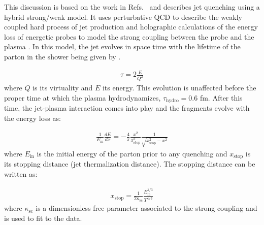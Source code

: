 
This discussion is based on the work in Refs.~\cite{Casalderrey-Solana:2014bpa, Hulcher:2017cpt, Casalderrey-Solana:2016jvj} and describes jet quenching using a hybrid strong/weak model.
It uses perturbative QCD to describe the weakly coupled hard process of jet production and holographic calculations of the energy loss of energetic probes to model the strong coupling between the probe and the plasma \cite{Chesler:2015nqz, Chesler:2014jva}.
In this model, the jet evolves in space time with the lifetime of the parton in the shower being given by \cite{CasalderreySolana:2011gx}.
 

\begin{align}
\tau = 2 \frac{E}{Q^2}
\end{align}
where $Q$ is its virtuality and $E$ its energy.
This evolution is unaffected before the proper time at which the plasma hydrodynamizes, $\tau_{\text{hydro}} = 0.6$ fm.
After this time, the jet-plasma interaction comes into play and the fragments evolve with the energy loss as:

\begin{align}
\frac{1}{E_{\mathrm{in}}} \frac{dE}{dx} = -\frac{4}{\pi} \frac{x^2}{x_{\mathrm{stop}}^2} \frac{1}{\sqrt{x_{\mathrm{stop}}^2 - x^2}}
\end{align}
where $E_{\mathrm{in}}$ is the initial energy of the parton prior to any quenching and $x_{\mathrm{stop}}$ is its stopping distance (jet thermalization distance).
The stopping distance can be written as:

\begin{align}
x_\mathrm{stop} = \frac{1}{2\kappa_\mathrm{sc}} \frac{E_\mathrm{in}^{1/3}}{T^{4/3}}
\end{align}
where $\kappa_\mathrm{sc}$ is a dimensionless free parameter associated to the strong coupling and is used to fit to the data.

